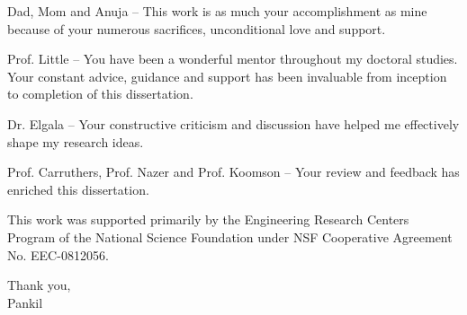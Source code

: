 \vskip 0.5in
\noindent
Dad, Mom and Anuja -- This work is as much your accomplishment as mine because of your numerous sacrifices, unconditional love and support.
\newline

\noindent
Prof. Little -- You have been a wonderful mentor throughout my doctoral studies. Your constant advice, guidance and support has been invaluable from inception to completion of this dissertation.
\newline

\noindent
Dr. Elgala -- Your constructive criticism and discussion have helped me effectively shape my research ideas.
\newline

\noindent
Prof. Carruthers, Prof. Nazer and Prof. Koomson -- Your review and feedback has enriched this dissertation.
\newline

\noindent
This work was supported primarily by the Engineering Research Centers Program of the National Science Foundation under NSF Cooperative Agreement No. EEC-0812056.
\newline

\vskip 0.5in
\noindent
Thank you,\\
Pankil